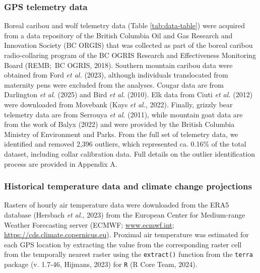 \documentclass[
  12pt,
]{article}
\begin{document}
\subsubsection{GPS telemetry data}\label{gps-telemetry-data}

\noindent Boreal caribou and wolf telemetry data (Table \ref{tab:data-table}) were acquired from a data repository of the British Columbia Oil and Gas Research and Innovation Society (BC ORGIS) that was collected as part of the boreal caribou radio-collaring program of the BC OGRIS Research and Effectiveness Monitoring Board (REMB\(;\) BC OGRIS, 2018). Southern mountain caribou data were obtained from Ford \emph{et al.} (2023), although individuals translocated from maternity pens were excluded from the analyses. Cougar data are from Darlington \emph{et al.} (2025) and Bird \emph{et al.} (2010). Elk data from Ciuti \emph{et al.} (2012) were downloaded from Movebank (Kays \emph{et al.}, 2022). Finally, grizzly bear telemetry data are from Serrouya \emph{et al.} (2011), while mountain goat data are from the work of Balyx (2022) and were provided by the British Columbia Ministry of Environment and Parks. From the full set of telemetry data, we identified and removed 2,396 outliers, which represented ca. 0.16\% of the total dataset, including collar calibration data. Full details on the outlier identification process are provided in Appendix A.

\subsubsection{Historical temperature data and climate change projections}\label{historical-temperature-data-and-climate-change-projections}

\noindent Rasters of hourly air temperature data were downloaded from the ERA5 database (Hersbach \emph{et al.}, 2023) from the European Center for Medium-range Weather Forecasting server (ECMWF; \url{www.ecmwf.int}; \url{https://cds.climate.copernicus.eu}). Proximal air temperature was estimated for each GPS location by extracting the value from the corresponding raster cell from the temporally nearest raster using the \texttt{extract()} function from the \texttt{terra} package (v. 1.7-46, Hijmans, 2023) for \texttt{R} (R Core Team, 2024).
\end{document}
